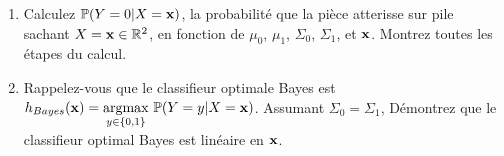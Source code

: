 \documentclass[11pt,french,english]{article}
\begin{document}
\begin{enumerate}
\begin{enumerate}
\item {}
{Calculez $\mathbb{P}(Y=0|X=\mathbf{x})$, la probabilité que la pièce atterisse sur pile sachant $X=\mathbf{x}\in\mathbb{R}^{2}$, en fonction de $\mu_{0}$, $\mu_{1}$, $\Sigma_{0}$, $\Sigma_{1}$, et $\mathbf{x}$.
Montrez toutes les étapes du calcul.}

\item {}%
{Rappelez-vous que le classifieur optimale Bayes est $h_{Bayes}(\mathbf{x}) = \underset{y \in \{0,1\}}{\mathrm{argmax}}\ \mathbb{P}(Y=y|X=\mathbf{x})$. Assumant $\Sigma_0 = \Sigma_1$, Démontrez que le classifieur optimal Bayes est linéaire en $\mathbf{x}$. }
\end{enumerate}
\end{enumerate}

\end{document}
